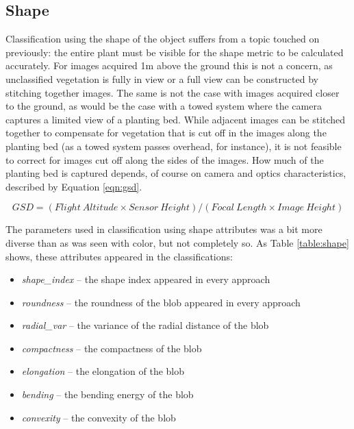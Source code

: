 \documentclass[letterpaper]{article}
\begin{document}
{%
{
\renewcommand{\arraystretch}{1.2}

}


\subsection{Shape}
Classification using the shape of the object suffers from a topic touched on previously: the entire plant must be visible for the shape metric to be calculated accurately. For images acquired 1m above the ground this is not a concern, as unclassified vegetation is fully in view or a full view can be constructed by stitching together images. The same is not the case with images acquired closer to the ground, as would be the case with a towed system where the camera captures a limited view of a planting bed. While adjacent images can be stitched together to compensate for vegetation that is cut off in the images along the planting bed (as a towed system passes overhead, for instance), it is not feasible to correct for images cut off along the sides of the images. How much of the planting bed is captured depends, of course on camera and 
optics characteristics, described by Equation \ref{eqn:gsd}.

\begin{equation}
\label{eqn:gsd}
GSD = (Flight\ Altitude \times Sensor\ Height) / (Focal\ Length \times Image\ Height)
\end{equation}

The parameters used in classification using shape attributes was a bit more diverse than as was seen with color, but not completely so. As Table \ref{table:shape} shows, these attributes appeared in the classifications:
\begin{itemize}
	\item{\textit{shape\_index} -- the shape index appeared in every approach}
	\item{\textit{roundness} -- the roundness of the blob appeared in every approach}
	\item{\textit{radial\_var} -- the variance of the radial distance of the blob}
	\item{\textit{compactness} -- the compactness of the blob}
	\item{\textit{elongation} -- the elongation of the blob}
	\item{\textit{bending} -- the bending energy of the blob}
	\item{\textit{convexity} -- the convexity of the blob}
\end{itemize}

}
\end{document}
